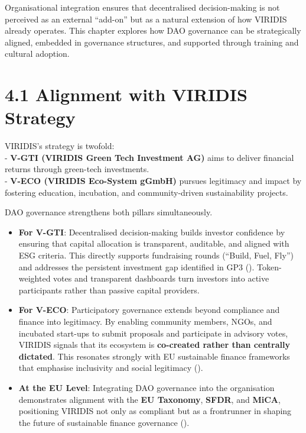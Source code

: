 \documentclass[
  english,
  12pt,
  oneside,
  open=any]{scrbook}
\begin{document}
Organisational integration ensures that decentralised decision-making is
not perceived as an external ``add-on'' but as a natural extension of
how VIRIDIS already operates. This chapter explores how DAO governance
can be strategically aligned, embedded in governance structures, and
supported through training and cultural adoption.

\section{4.1 Alignment with VIRIDIS Strategy}\label{sec-alignment}

VIRIDIS's strategy is twofold:\\
- \textbf{V-GTI (VIRIDIS Green Tech Investment AG)} aims to deliver
financial returns through green-tech investments.\\
- \textbf{V-ECO (VIRIDIS Eco-System gGmbH)} pursues legitimacy and
impact by fostering education, incubation, and community-driven
sustainability projects.

DAO governance strengthens both pillars simultaneously.

\begin{itemize}
\item
  \textbf{For V-GTI}: Decentralised decision-making builds investor
  confidence by ensuring that capital allocation is transparent,
  auditable, and aligned with ESG criteria. This directly supports
  fundraising rounds (``Build, Fuel, Fly'') and addresses the persistent
  investment gap identified in GP3
  ().
  Token-weighted votes and transparent dashboards turn investors into
  active participants rather than passive capital providers.
\item
  \textbf{For V-ECO}: Participatory governance extends beyond compliance
  and finance into legitimacy. By enabling community members, NGOs, and
  incubated start-ups to submit proposals and participate in advisory
  votes, VIRIDIS signals that its ecosystem is \textbf{co-created rather
  than centrally dictated}. This resonates strongly with EU sustainable
  finance frameworks that emphasise inclusivity and social legitimacy
  ().
\item
  \textbf{At the EU Level}: Integrating DAO governance into the
  organisation demonstrates alignment with the \textbf{EU Taxonomy},
  \textbf{SFDR}, and \textbf{MiCA}, positioning VIRIDIS not only as
  compliant but as a frontrunner in shaping the future of sustainable
  finance governance
  ().
\end{itemize}
\end{document}
